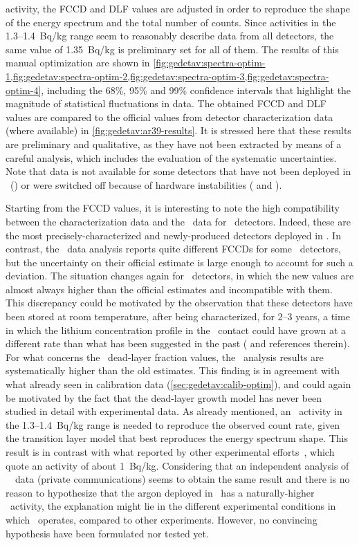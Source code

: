 activity, the FCCD and DLF values are adjusted in order to reproduce the shape of the
energy spectrum and the total number of counts. Since activities in the 1.3--1.4~Bq/kg range
seem to reasonably describe data from all detectors, the same value of 1.35~Bq/kg is
preliminary set for all of them. The results of this manual optimization are shown in
\cref{fig:gedetav:spectra-optim-1,fig:gedetav:spectra-optim-2,fig:gedetav:spectra-optim-3,fig:gedetav:spectra-optim-4},
including the 68\%, 95\% and 99\% confidence intervals that highlight the magnitude of
statistical fluctuations in data. The obtained FCCD and DLF values are compared to the
official values from detector characterization data (where available) in
\cref{fig:gedetav:ar39-results}. It is stressed here that these results are preliminary
and qualitative, as they have not been extracted by means of a careful analysis, which
includes the evaluation of the systematic uncertainties. Note that data is not available
for some detectors that have not been deployed in \phasetwop\ () or were switched
off because of hardware instabilities ( and ).

Starting from the FCCD values, it is interesting to note the high compatibility between
the characterization data and the \Arl\ data for \icoax\ detectors. Indeed, these are the
most precisely-characterized and newly-produced detectors deployed in \gerda. In contrast,
the \Arl\ data analysis reports quite different FCCDs for some \scoax\ detectors, but the
uncertainty on their official estimate is large enough to account for such a deviation.
The situation changes again for \bege\ detectors, in which the new values are almost
always higher than the official estimates and incompatible with them. This discrepancy
could be motivated by the observation that these detectors have been stored at room
temperature, after being characterized, for 2--3 years, a time in which the lithium
concentration profile in the \nplus\ contact could have grown at a different rate than
what has been suggested in the past (\cite{Agostini2019} and references therein). For what
concerns the \bege\ dead-layer fraction values, the \Arl\ analysis results are
systematically higher than the old estimates. This finding is in agreement with what
already seen in calibration data (\cref{sec:gedetav:calib-optim}), and could again be
motivated by the fact that the dead-layer growth model has never been studied in detail
with experimental data.
\newpar
As already mentioned, an \Arl\ activity in the 1.3--1.4~Bq/kg range is needed to reproduce
the observed count rate, given the transition layer model that best reproduces the energy
spectrum shape. This result is in contrast with what reported by other experimental
efforts~\cite{Ajaj2019, Calvo2017, Benetti2006, Loosli1983}, which quote an activity of
about 1~Bq/kg. Considering that an independent analysis of \gerda\ \phaseone\ data
(private communications) seems to obtain the same result and there is no reason to
hypothesize that the argon deployed in \gerda\ has a naturally-higher \Arl\ activity, the
explanation might lie in the different experimental conditions in which \gerda\ operates,
compared to other experiments. However, no convincing hypothesis have been formulated nor
tested yet.

